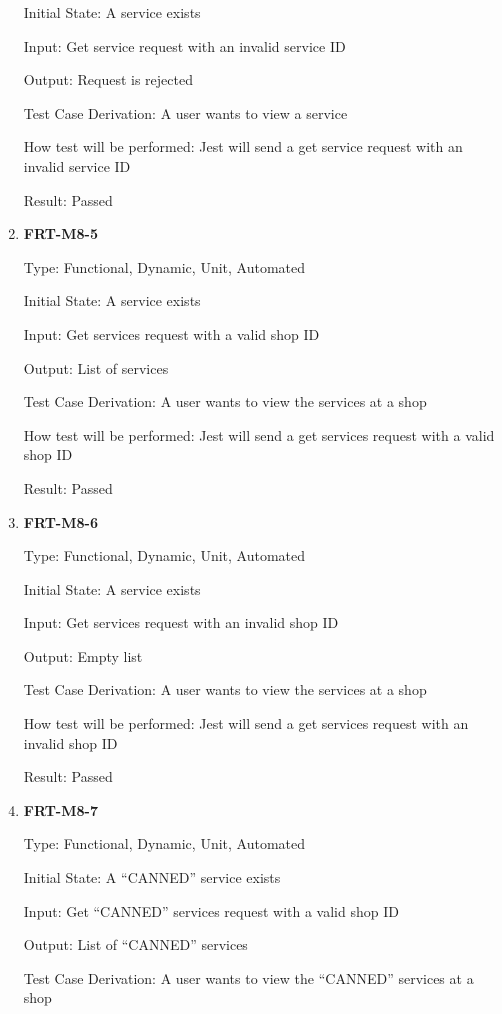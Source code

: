 \documentclass[12pt, titlepage]{article}
\begin{document}
\begin{enumerate}
	      Initial State: A service exists

	      Input: Get service request with an invalid service ID

	      Output: Request is rejected

	      Test Case Derivation: A user wants to view a service

	      How test will be performed: Jest will send a get service request with an invalid service ID

	      Result: Passed

	\item \textbf{FRT-M8-5}

	      Type: Functional, Dynamic, Unit, Automated

	      Initial State: A service exists

	      Input: Get services request with a valid shop ID

	      Output: List of services

	      Test Case Derivation: A user wants to view the services at a shop

	      How test will be performed: Jest will send a get services request with a valid shop ID

	      Result: Passed

	\item \textbf{FRT-M8-6}

	      Type: Functional, Dynamic, Unit, Automated

	      Initial State: A service exists

	      Input: Get services request with an invalid shop ID

	      Output: Empty list

	      Test Case Derivation: A user wants to view the services at a shop

	      How test will be performed: Jest will send a get services request with an invalid shop ID

	      Result: Passed

	\item \textbf{FRT-M8-7}

	      Type: Functional, Dynamic, Unit, Automated

	      Initial State: A ``CANNED'' service exists

	      Input: Get ``CANNED'' services request with a valid shop ID

	      Output: List of ``CANNED'' services

	      Test Case Derivation: A user wants to view the ``CANNED'' services at a shop


\end{enumerate}
\end{document}
